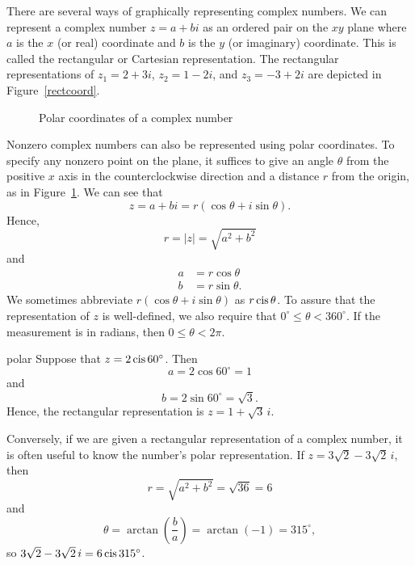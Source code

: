 
There are several ways of graphically representing complex numbers. We
can represent a complex number $z = a +bi$ as an ordered pair on the
$xy$ plane where $a$ is the $x$ (or real) coordinate and $b$ is the $y$
(or imaginary) coordinate. This is called the {\bfi rectangular} or
{\bfi Cartesian} representation. The rectangular representations of
$z_1 = 2 + 3i$, $z_2 = 1 - 2i$, and $z_3 = - 3 + 2i$ are depicted in
Figure~\ref{rectcoord}.
 
 
\begin{figure}[htb]
\begin{center}

\end{center}
\caption{Polar coordinates of a complex number}
\label{polarcoord}
\end{figure}
 
 
Nonzero complex numbers can also be represented using {\bfi polar
coordinates}.  To specify  any nonzero point on the plane, it suffices
to give an angle $\theta$ from the positive $x$ axis in the
counterclockwise direction and a distance $r$ from the origin, as in 
Figure~\ref{polarcoord}. We can see that 
\[
z = a + bi = r( \cos \theta + i \sin \theta).
\]
Hence,
\[
r = |z| = \sqrt{a^2+b^2}
\]
and
\begin{align*}
a & = r \cos \theta \\
b & = r \sin \theta.
\end{align*}
We sometimes abbreviate $r( \cos \theta + i \sin \theta)$ as $r \operatorname{cis}
\theta$\label{cosisin}.  To assure that the representation of $z$ is 
well-defined, we also require that $0^{\circ} \leq \theta <
360^{\circ}$.  If the measurement is in radians, then $0 \leq \theta <
2 \pi$. 
 
\begin{example}{polar}
Suppose that $z = 2 \operatorname{cis}  60^{\circ}$. Then
\[
a  =  2 \cos 60^{\circ}  =   1
\]
and
\[
b  =  2 \sin 60^{\circ}  =  \sqrt{3}.
\]
Hence, the rectangular representation is $z = 1+\sqrt{3}\, i$.
 
 
Conversely, if we are given a rectangular representation of a complex
number, it is often useful to know the number's polar representation.
If $z = 3 \sqrt{2} - 3 \sqrt{2}\, i$, then 
\[
r = \sqrt{a^2 + b^2} = \sqrt{36 } = 6
\]
and
\[
\theta = \arctan \left( \frac{b}{a} \right) = \arctan( - 1) =
315^{\circ},
\]
so $3 \sqrt{2} - 3 \sqrt{2}\, i=6 \operatorname{cis}  315^{\circ}$.
\end{example}
 

